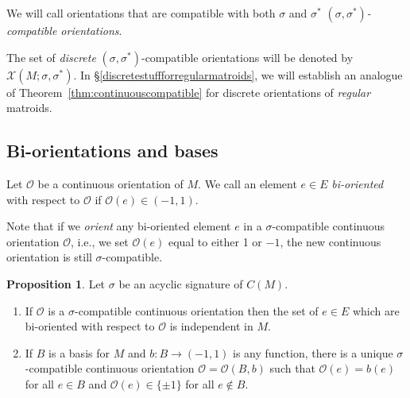 \documentclass[12pt]{amsart}
\numberwithin{equation}{section}
\theoremstyle{definition}
\newtheorem{proposition}[theorem]{Proposition}
\begin{document}
We will call orientations that are compatible with both $\sigma$ and $\sigma^*$ {\em $(\sigma,\sigma^*)$-compatible orientations}. 

\medskip

The set of {\em discrete} $(\sigma,\sigma^*)$-compatible orientations will be denoted by $\mathcal{X}(M;\sigma,\sigma^*)$.
In \S\ref{discretestuffforregularmatroids}, we will establish an analogue of Theorem~\ref{thm:continuouscompatible} for discrete orientations of {\em regular} matroids.


\subsection{Bi-orientations and bases}

Let ${\mathcal O}$ be a continuous orientation of $M$.  We call an element $e \in E$ {\em bi-oriented} with respect to ${\mathcal O}$ if 
${\mathcal O}(e) \in (-1,1)$.

Note that if we {\em orient} any bi-oriented element $e$ in a $\sigma$-compatible continuous orientation $\mathcal{O}$, i.e., we set $\mathcal{O}(e)$ equal to either 1 or $-1$, the new continuous orientation is still $\sigma$-compatible. 


\begin{proposition} \label{prop:uniqueext}
Let $\sigma$ be an acyclic signature of $C(M)$.
\begin{enumerate}
\item If ${\mathcal O}$ is a $\sigma$-compatible continuous orientation then the set of $e \in E$ which are bi-oriented with respect to ${\mathcal O}$ is independent in $M$.
\item If $B$ is a basis for $M$ and $b : B \to (-1,1)$ is any function, there is a unique $\sigma$-compatible continuous orientation 
${\mathcal O} = {\mathcal O}(B,b)$ such that ${\mathcal O}(e) = b(e)$ for all $e \in B$ and ${\mathcal O}(e) \in \{ \pm 1 \}$ for all $e \not\in B$.
\end{enumerate}
\end{proposition}
\end{document}
